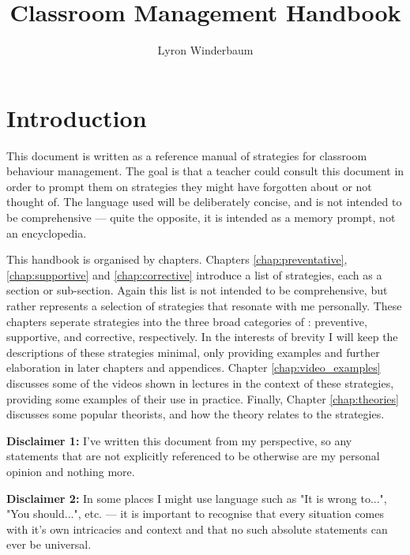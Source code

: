 \documentclass[12pt]{report}
\title{Classroom Management Handbook}
\author{Lyron Winderbaum}
\begin{document}
\maketitle

\tableofcontents

\chapter{Introduction}

This document is written as a reference manual of strategies for classroom behaviour management. The goal is that a teacher could consult this document in order to prompt them on strategies they might have forgotten about or not thought of. The language used will be deliberately concise, and is not intended to be comprehensive --- quite the opposite, it is intended as a memory prompt, not an encyclopedia.

This handbook is organised by chapters. Chapters \ref{chap:preventative}, \ref{chap:supportive} and \ref{chap:corrective} introduce a list of strategies, each as a section or sub-section.
Again this list is not intended to be comprehensive, but rather represents a selection of strategies that resonate with me personally. These chapters seperate strategies into the three broad categories of \cite{Charles2002}: preventive, supportive, and corrective, respectively. In the interests of brevity I will keep the descriptions of these strategies minimal, only providing examples and further elaboration in later chapters and appendices. Chapter \ref{chap:video_examples} discusses some of the videos shown in lectures in the context of these strategies, providing some examples of their use in practice. Finally, Chapter \ref{chap:theories} discusses some popular theorists, and how the theory relates to the strategies.

\textbf{Disclaimer 1:} I've written this document from my perspective, so any statements that are not explicitly referenced to be otherwise are my personal opinion and nothing more.

\textbf{Disclaimer 2:} In some places I might use language such as "It is wrong to...", "You should...", etc. --- it is important to recognise that every situation comes with it's own intricacies and context and that no such absolute statements can ever be universal.
\end{document}
